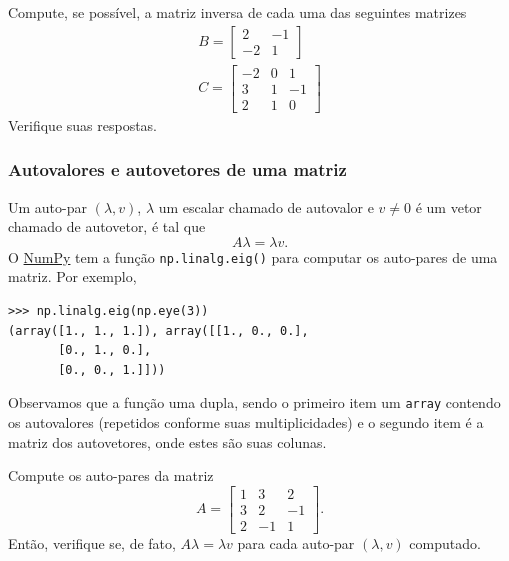 \documentclass[12pt]{article}
\begin{document}
\begin{exr}
  Compute, se possível, a matriz inversa de cada uma das seguintes matrizes
  \begin{gather}
    B =
    \begin{bmatrix}
      2 & -1\\
      -2 & 1
    \end{bmatrix}\\
    C =
    \begin{bmatrix}
      -2 & 0 & 1\\
      3 & 1 & -1\\
      2 & 1 & 0
    \end{bmatrix}
  \end{gather}
  Verifique suas respostas.
\end{exr}

\subsubsection{Autovalores e autovetores de uma matriz}

Um auto-par $(\lambda, v)$, $\lambda$ um escalar chamado de autovalor e $v\neq 0$ é um vetor chamado de autovetor, é tal que
\begin{equation}
  A\lambda = \lambda v.
\end{equation}
O \href{https://numpy.org/}{NumPy} tem a função \lstinline+np.linalg.eig()+ para computar os auto-pares de uma matriz. Por exemplo,

\begin{lstlisting}
>>> np.linalg.eig(np.eye(3))
(array([1., 1., 1.]), array([[1., 0., 0.],
       [0., 1., 0.],
       [0., 0., 1.]]))
\end{lstlisting}

Observamos que a função uma dupla, sendo o primeiro item um \lstinline+array+ contendo os autovalores (repetidos conforme suas multiplicidades) e o segundo item é a matriz dos autovetores, onde estes são suas colunas.

\begin{exr}
  Compute os auto-pares da matriz
  \begin{equation}
    A =
    \begin{bmatrix}
      1 & 3 & 2\\
      3 & 2 & -1\\
      2 & -1 & 1
    \end{bmatrix}.
  \end{equation}
  Então, verifique se, de fato, $A\lambda = \lambda v$ para cada auto-par $(\lambda, v)$ computado.
\end{exr}
\end{document}
